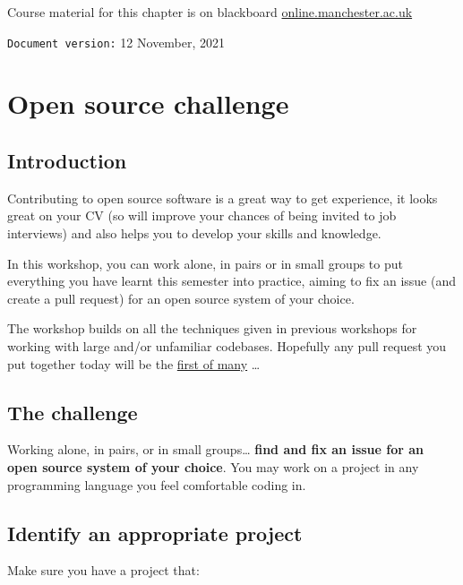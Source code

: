 \documentclass[
]{book}
\begin{document}
Course material for this chapter is on blackboard \href{https://online.manchester.ac.uk}{online.manchester.ac.uk}

\texttt{Document\ version:} 12 November, 2021

\hypertarget{opening}{%
\chapter{Open source challenge}\label{opening}}

\hypertarget{introduction-1}{%
\section{Introduction}\label{introduction-1}}

Contributing to open source software is a great way to get experience, it looks great on your CV (so will improve your chances of being invited to job interviews) and also helps you to develop your skills and knowledge. \citep{experiencing, spinellis}

In this workshop, you can work alone, in pairs or in small groups to put everything you have learnt this semester into practice, aiming to fix an issue (and create a pull request) for an open source system of your choice.

The workshop builds on all the techniques given in previous workshops for working with large and/or unfamiliar codebases.
Hopefully any pull request you put together today will be the \href{http://firstpr.me}{first of many} \ldots{}

\hypertarget{challenge}{%
\section{The challenge}\label{challenge}}

Working alone, in pairs, or in small groups\ldots{} \textbf{find and fix an issue for an open source system of your choice}.
You may work on a project in any programming language you feel comfortable coding in.

\hypertarget{projecti}{%
\section{Identify an appropriate project}\label{projecti}}

Make sure you have a project that:
\end{document}
